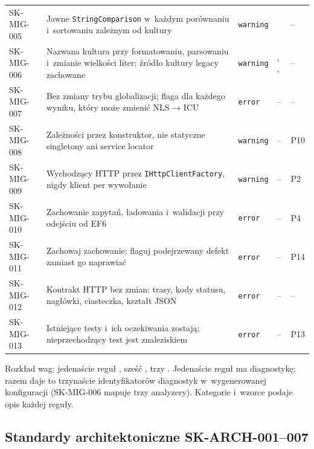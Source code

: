 {\begin{xltabular}{\linewidth}{@{}>{\raggedright\arraybackslash}p{2.3cm} >{\raggedright\arraybackslash}X >{\raggedright\arraybackslash}p{1.95cm} >{\raggedright\arraybackslash}p{3.9cm} >{\raggedright\arraybackslash}p{1.15cm}@{}}
SK-MIG-005 & Jawne \texttt{StringComparison} w~każdym porównaniu i~sortowaniu zależnym od kultury & \texttt{warning} &  & -- \\
SK-MIG-006 & Nazwana kultura przy formatowaniu, parsowaniu i~zmianie wielkości liter; źródło kultury legacy zachowane & \texttt{warning} & , ,  & -- \\
SK-MIG-007 & Bez zmiany trybu globalizacji; flaga dla każdego wyniku, który może zmienić NLS → ICU & \texttt{error} & -- & -- \\
SK-MIG-008 & Zależności przez konstruktor, nie statyczne singletony ani service locator & \texttt{warning} & -- & P10 \\
SK-MIG-009 & Wychodzący HTTP przez \texttt{IHttpClientFactory}, nigdy klient per wywołanie & \texttt{warning} & -- & P2 \\
SK-MIG-010 & Zachowanie zapytań, ładowania i~walidacji przy odejściu od EF6 & \texttt{error} & -- & P4 \\
SK-MIG-011 & Zachowaj zachowanie; flaguj podejrzewany defekt zamiast go naprawiać & \texttt{error} & -- & P14 \\
SK-MIG-012 & Kontrakt HTTP bez zmian: trasy, kody statusu, nagłówki, ciasteczka, kształt JSON & \texttt{error} & -- & -- \\
SK-MIG-013 & Istniejące testy i~ich oczekiwania zostają; nieprzechodzący test jest znaleziskiem & \texttt{error} & -- & P13 \\
\bottomrule
\end{xltabular}
}

Rozkład wag: jedenaście reguł , sześć , trzy
. Jedenaście reguł ma diagnostykę; razem daje to trzynaście
identyfikatorów diagnostyk w~wygenerowanej konfiguracji (SK-MIG-006 mapuje trzy analyzery).
Kategorie i~wzorce  podaje opis każdej reguły.


\subsection{Standardy architektoniczne SK-ARCH-001--007}\label{sec:standardy-arch}

